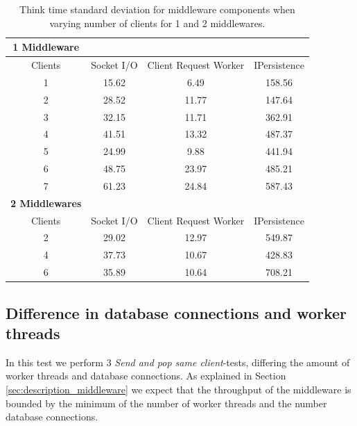 \documentclass{article}
\begin{document}
            \begin{table}
                \begin{tabular}{|c|c|c|c|}
                    \hline
                    \textbf{1 Middleware} & & &\\
                    \hline
                    Clients & Socket I/O & Client Request Worker & IPersistence \\ \hline
                    1&   15.62 &     6.49 &   158.56 \\ \hline  
                    2&   28.52 &    11.77 &   147.64 \\ \hline  
                    3&   32.15 &    11.71 &   362.91 \\ \hline  
                    4&     41.51 &    13.32 &   487.37 \\ \hline  
                    5&   24.99 &     9.88 &   441.94 \\ \hline  
                    6&   48.75 &    23.97 &   485.21 \\ \hline  
                    7&   61.23 &    24.84 &   587.43 \\ \hline      
                    \textbf{2 Middlewares} & & & \\  
                        \hline
                        Clients &   Socket I/O & Client Request Worker & IPersistence \\ \hline
                    2&  29.02 &    12.97 &   549.87 \\ \hline  
                    4&  37.73 &    10.67 &   428.83 \\ \hline  
                    6&  35.89 &    10.64 &   708.21 \\ \hline 
                \end{tabular}
                \caption{Think time standard deviation for middleware components when varying number of clients for 1 and 2 middlewares.}
                \label{table:thinktime_std_middleware_clients}
            \end{table}

        \subsection{Difference in database connections and worker threads}
            \label{sec:difference_in_dbcons_and_worker_threads}
            In this test we perform 3 \textit{Send and pop same client}-tests, differing the amount of worker threads and database connections. As explained in Section \ref{sec:description_middleware} we expect that the throughput of the middleware is bounded by the minimum of the number of worker threads and the number database connections.
\end{document}
